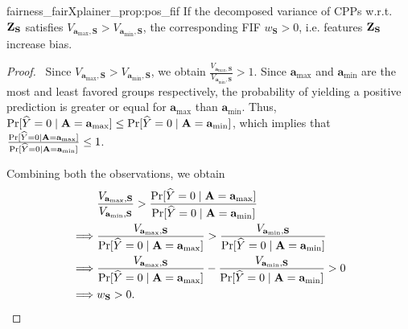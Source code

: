 \begin{repproposition}{fairness_fairXplainer_prop:pos_fif}
	{If the decomposed variance of CPPs w.r.t.\ $ \mathbf{Z}_{\mathbf{S}} $ satisfies $ V_{\mathbf{a}_{\max}, \mathbf{S}} > {V_{\mathbf{a}_{\min}, \mathbf{S}}} $, the corresponding FIF $ w_{\mathbf{S}} > 0  $, i.e. features $ \mathbf{Z}_{\mathbf{S}} $ increase bias.}
\end{repproposition}
\begin{proof}\
	Since $	V_{\mathbf{a}_{\max}, \mathbf{S}} > V_{\mathbf{a}_{\min}, \mathbf{S}}$, we obtain $
	\frac{V_{\mathbf{a}_{\max}, \mathbf{S}}}{V_{\mathbf{a}_{\min}, \mathbf{S}}} > 1.$
Since $\mathbf{a}_{\max}$ and $\mathbf{a}_{\min}$ are the most and least favored groups respectively, the probability of yielding a positive prediction is greater or equal for $\mathbf{a}_{\max}$ than $\mathbf{a}_{\min}$. Thus, ${\Pr[\widehat{Y} = 0 \mid  \mathbf{A} = \mathbf{a}_{\max}]} \leq {\Pr[\widehat{Y} = 0 \mid  \ensuremath{\mathbf{A}}= \mathbf{a}_{\min}]}$, which implies that $\frac{\Pr[\widehat{Y} = 0 \mid  \mathbf{A} = \mathbf{a}_{\max}]}{\Pr[\widehat{Y} = 0 \mid  \mathbf{A} = \mathbf{a}_{\min}]} \leq 1$.

Combining both the observations, we obtain
\begin{align*}
&\frac{V_{\mathbf{a}_{\max}, \mathbf{S}}}{V_{\mathbf{a}_{\min}, \mathbf{S}}} > \frac{\Pr[\widehat{Y} = 0 \mid  \mathbf{A} = \mathbf{a}_{\max}]}{\Pr[\widehat{Y} = 0 \mid  \mathbf{A} = \mathbf{a}_{\min}]}\\
\implies &\frac{V_{\mathbf{a}_{\max}, \mathbf{S}}}{\Pr[\widehat{Y} = 0 \mid  \mathbf{A} = \mathbf{a}_{\max}]} > \frac{V_{\mathbf{a}_{\min}, \mathbf{S}}}{\Pr[\widehat{Y} = 0 \mid  \mathbf{A} = \mathbf{a}_{\min}]}\\
\implies &\frac{V_{\mathbf{a}_{\max}, \mathbf{S}}}{\Pr[\widehat{Y} = 0 \mid  \mathbf{A} = \mathbf{a}_{\max}]} - \frac{V_{\mathbf{a}_{\min}, \mathbf{S}}}{\Pr[\widehat{Y} = 0 \mid  \mathbf{A} = \mathbf{a}_{\min}]} > 0\\
\implies &w_{\mathbf{S}} > 0.
\end{align*}
\end{proof}

